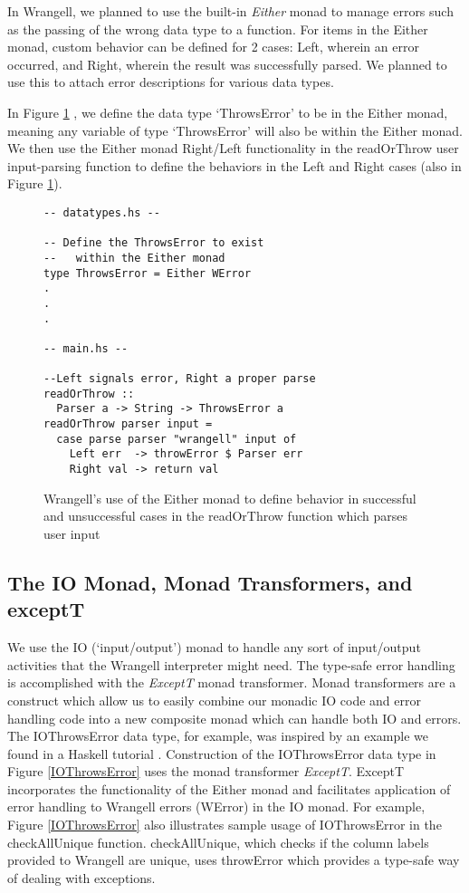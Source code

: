 \documentclass[preprint,nocopyrightspace]{sig-alternate}
\begin{document}
In Wrangell, we planned to use the built-in \emph{Either} monad to manage errors such as the passing of the wrong data type to a function. For items in the Either monad, custom behavior can be defined for 2 cases: Left, wherein an error occurred, and Right, wherein the result was successfully parsed. We planned to use this to attach error descriptions for various data types.  

In Figure \ref{eitherThrowError0} , we define the data type `ThrowsError' to be in the Either monad, meaning any variable of type `ThrowsError' will also be within the Either monad. We then use the Either monad Right/Left functionality in the readOrThrow user input-parsing function to define the behaviors in the Left and Right cases (also in Figure \ref{eitherThrowError0}).

\begin{figure}
\begin{lstlisting}
-- datatypes.hs --

-- Define the ThrowsError to exist 
--   within the Either monad
type ThrowsError = Either WError
.
.
.

-- main.hs --

--Left signals error, Right a proper parse
readOrThrow :: 
  Parser a -> String -> ThrowsError a
readOrThrow parser input = 
  case parse parser "wrangell" input of
    Left err  -> throwError $ Parser err
    Right val -> return val 

\end{lstlisting}
\caption{Wrangell's use of the Either monad to define behavior in successful and unsuccessful cases in the readOrThrow function which parses user input}
\label{eitherThrowError0}
\end{figure}

\subsection{The IO Monad, Monad Transformers, and exceptT}
We use the IO (`input/output') monad to handle any sort of input/output activities that the Wrangell interpreter might need. The type-safe error handling is accomplished with the \textit{ExceptT} monad transformer. Monad transformers \cite{monadTransform} are a construct which allow us to easily combine our monadic IO code and error handling code into a new composite monad which can handle both IO and errors.
The IOThrowsError data type, for example, was inspired by an example we found in a Haskell tutorial \cite{writeScheme48}. Construction of the IOThrowsError data type in Figure \ref{IOThrowsError} uses the monad transformer \emph{ExceptT}. ExceptT incorporates the functionality of the Either monad and facilitates application of error handling to Wrangell errors (WError) in the IO monad. For example, Figure \ref{IOThrowsError} also illustrates sample usage of IOThrowsError in the checkAllUnique function. checkAllUnique, which checks if the column labels provided to Wrangell are unique, uses throwError which provides a type-safe way of dealing with exceptions. 
\end{document}
